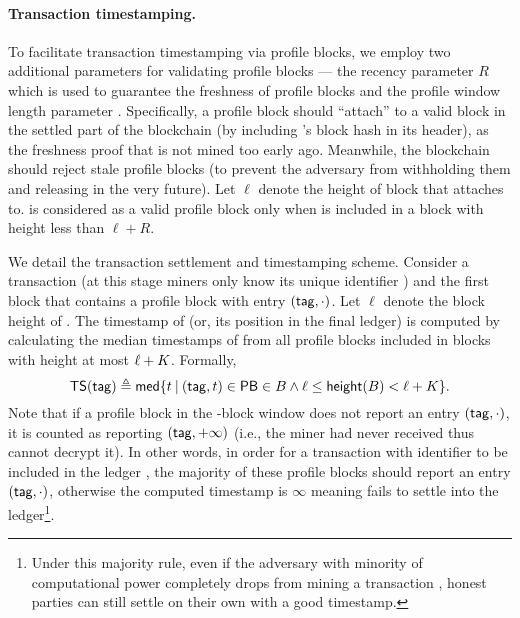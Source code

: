 \paragraph{Transaction timestamping.}
%
To facilitate transaction timestamping via profile blocks, we employ two additional parameters for validating profile blocks --- the recency parameter $R$ which is used to guarantee the freshness of profile blocks and the profile window length parameter \PBWindowLen.
%
Specifically, a profile block \PB should ``attach'' to a valid block \block in the settled part of the blockchain (by including \block's block hash in its header), as the freshness proof that \PB is not mined too early ago.
%
Meanwhile, the blockchain \chain should reject stale profile blocks (to prevent the adversary from withholding them and releasing in the very future).
%
Let $\ell$ denote the height of block \block that \PB attaches to.
%
\PB is considered as a valid profile block only when \PB is included in a block with height less than $\ell + R$.

We detail the transaction settlement and timestamping scheme.
%
Consider a transaction \tx (at this stage miners only know its unique identifier \txTag) and \block the first block that contains a profile block \PB with entry $(\mathsf{tag}, \cdot)$.
%
Let $\ell$ denote the block height of \block.
%
The timestamp of \tx (or, its position in the final ledger) is computed by calculating the median timestamps of \txTag from all profile blocks included in blocks with height at most $\ell + K$.
%
Formally,
%
\[ \mathsf{TS}(\mathsf{tag}) \triangleq \mathsf{med} \{ t \mathbin|  (\mathsf{tag}, t) \in \mathsf{PB} \in B \wedge \ell \le \mathsf{height}(B) < \ell + K\}. \]
%
Note that if a profile block in the \PBWindowLen-block window does not report an entry $(\mathsf{tag}, \cdot)$, it is counted as reporting $(\mathsf{tag}, +\infty)$ (i.e., the miner had never received \txTag thus cannot decrypt it).
%
In other words, in order for a transaction \tx with identifier \txTag to be included in the ledger \ledger, the majority of these profile blocks should report an entry $(\mathsf{tag}, \cdot)$, otherwise the computed timestamp is $\infty$ meaning \txTag fails to settle into the ledger\footnote{Under this majority rule, even if the adversary with minority of computational power completely drops from mining a transaction \txTag, honest parties can still settle \txTag on their own with a good timestamp.}.

